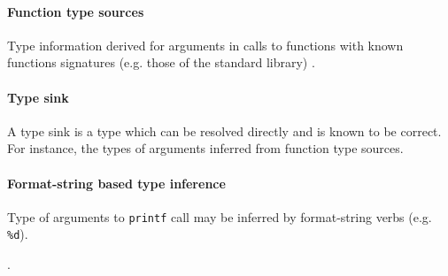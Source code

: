 


\paragraph{Function type sources}

Type information derived for arguments in calls to functions with known functions signatures (e.g. those of the standard library) \cite{type_inference_on_executables}.


\paragraph{Type sink}

A type sink is a type which can be resolved directly and is known to be correct. For instance, the types of arguments inferred from function type sources.


\paragraph{Format-string based type inference}


Type of arguments to \texttt{printf} call may be inferred by format-string verbs (e.g. \texttt{\%d}).

.
